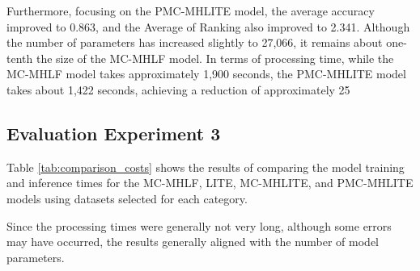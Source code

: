 \documentclass[conference]{IEEEtran}
\begin{document}

Furthermore, focusing on the PMC-MHLITE model, the average accuracy improved to 0.863, and the Average of Ranking also improved to 2.341. Although the number of parameters has increased slightly to 27,066, it remains about one-tenth the size of the MC-MHLF model. In terms of processing time, while the MC-MHLF model takes approximately 1,900 seconds, the PMC-MHLITE model takes about 1,422 seconds, achieving a reduction of approximately 25%



\subsection{Evaluation Experiment 3}

Table \ref{tab:comparison_costs} shows the results of comparing the model training and inference times for the MC-MHLF, LITE, MC-MHLITE, and PMC-MHLITE models using datasets selected for each category.


Since the processing times were generally not very long, although some errors may have occurred, the results generally aligned with the number of model parameters.

\end{document}

